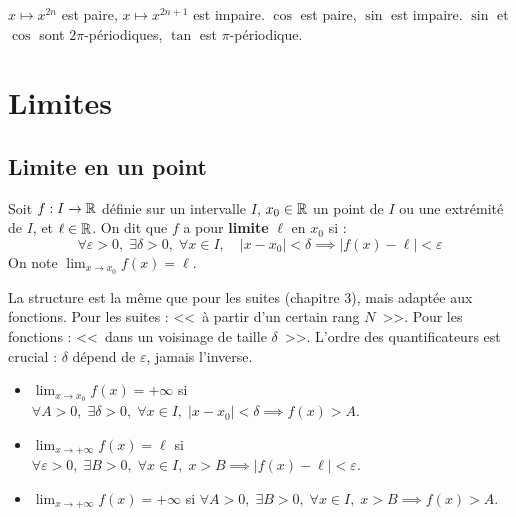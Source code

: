 \begin{exbox}
$x \mapsto x^{2n}$ est paire, $x \mapsto x^{2n+1}$ est impaire. $\cos$ est paire, $\sin$ est impaire. $\sin$ et $\cos$ sont $2\pi$-périodiques, $\tan$ est $\pi$-périodique.
\end{exbox}


\section{Limites}

\subsection{Limite en un point}

\begin{defbox}
Soit $f : I \to \mathbb{R}$ définie sur un intervalle $I$, $x_0 \in \mathbb{R}$ un point de $I$ ou une extrémité de $I$, et $\ell \in \mathbb{R}$. On dit que $f$ a pour \textbf{limite} $\ell$ en $x_0$ si :
\[\forall \varepsilon > 0, \; \exists \delta > 0, \; \forall x \in I, \quad |x - x_0| < \delta \implies |f(x) - \ell| < \varepsilon\]
On note $\displaystyle\lim_{x \to x_0} f(x) = \ell$.
\end{defbox}

\begin{intuitionbox}
La structure est la même que pour les suites (chapitre 3), mais adaptée aux fonctions. Pour les suites : <<~à partir d'un certain rang $N$~>>. Pour les fonctions : <<~dans un voisinage de taille $\delta$~>>. L'ordre des quantificateurs est crucial : $\delta$ dépend de $\varepsilon$, jamais l'inverse.
\end{intuitionbox}

\begin{defbox}
\begin{itemize}[leftmargin=1cm]
  \item $\displaystyle\lim_{x \to x_0} f(x) = +\infty$ si $\forall A > 0, \; \exists \delta > 0, \; \forall x \in I, \; |x - x_0| < \delta \implies f(x) > A$.
  \item $\displaystyle\lim_{x \to +\infty} f(x) = \ell$ si $\forall \varepsilon > 0, \; \exists B > 0, \; \forall x \in I, \; x > B \implies |f(x) - \ell| < \varepsilon$.
  \item $\displaystyle\lim_{x \to +\infty} f(x) = +\infty$ si $\forall A > 0, \; \exists B > 0, \; \forall x \in I, \; x > B \implies f(x) > A$.
\end{itemize}
\end{defbox}

